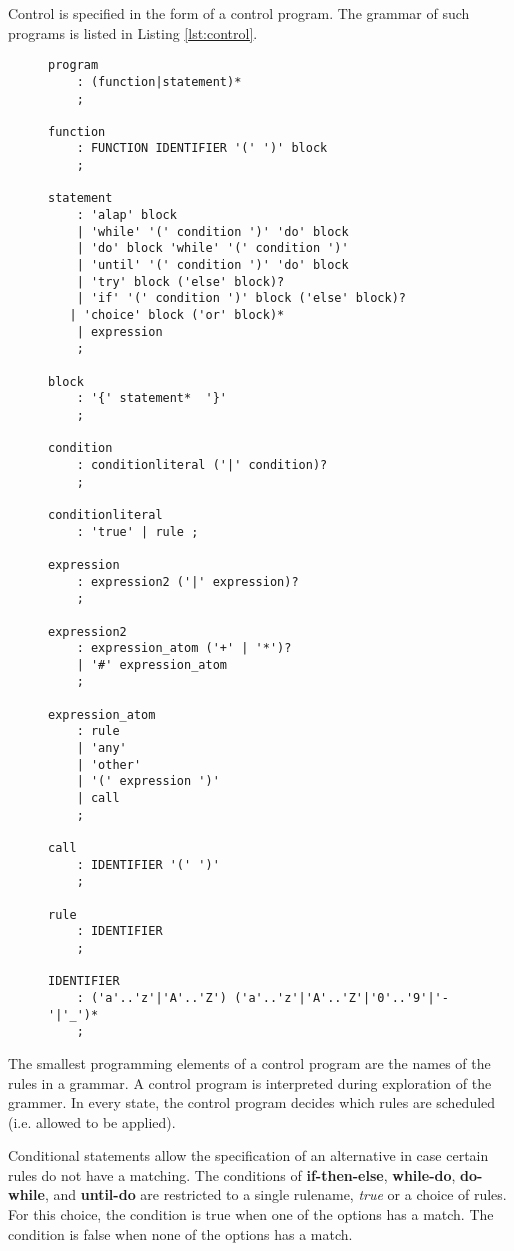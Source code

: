 Control is specified in the form of a control program. The grammar of such programs is listed in Listing \ref{lst:control}. 

\lstset{
	basicstyle=\ttfamily\scriptsize
}

\begin{figure}
\begin{lstlisting}[label=lst:control,caption={Grammar of Control Programs}]
program
	: (function|statement)*
	;

function
	: FUNCTION IDENTIFIER '(' ')' block
	;

statement 
	: 'alap' block
	| 'while' '(' condition ')' 'do' block
	| 'do' block 'while' '(' condition ')'
	| 'until' '(' condition ')' 'do' block
	| 'try' block ('else' block)?
	| 'if' '(' condition ')' block ('else' block)?
   | 'choice' block ('or' block)*
	| expression
	;

block
	: '{' statement*  '}'
	;

condition
	: conditionliteral ('|' condition)?
	;

conditionliteral
	: 'true' | rule ;

expression	
	: expression2 ('|' expression)?
	;

expression2
    : expression_atom ('+' | '*')?
    | '#' expression_atom
    ;

expression_atom
	: rule
	| 'any'
	| 'other'
	| '(' expression ')'
	| call
	; 

call
	: IDENTIFIER '(' ')'
	;

rule
	: IDENTIFIER
	;

IDENTIFIER
	: ('a'..'z'|'A'..'Z') ('a'..'z'|'A'..'Z'|'0'..'9'|'-'|'_')*
	;
\end{lstlisting}
\end{figure}

The smallest programming elements of a control program are the names of the rules in a grammar. A control program is interpreted during exploration of the grammer. In every state, the control program decides which rules are scheduled (i.e. allowed to be applied). 

Conditional statements allow the specification of an alternative in case certain rules do not have a matching. The conditions of \textbf{if-then-else}, \textbf{while-do}, \textbf{do-while}, and \textbf{until-do} are restricted to a single rulename, \emph{true} or a choice of rules. For this choice, the condition is true when one of the options has a match. The condition is false when none of the options has a match. 


